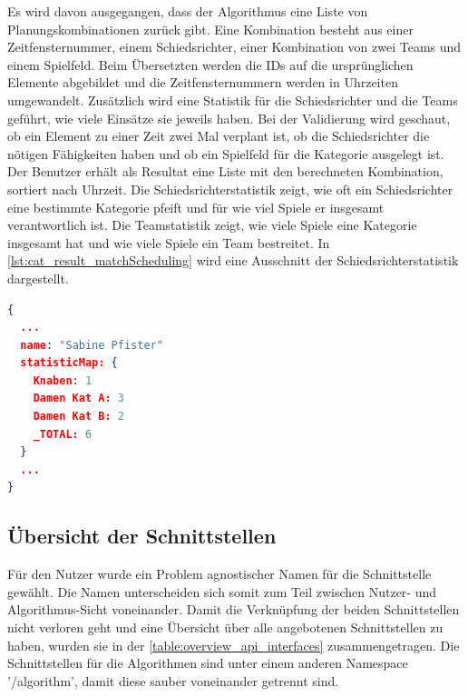 Es wird davon ausgegangen, dass der Algorithmus eine Liste von Planungskombinationen zurück gibt. Eine Kombination besteht aus einer Zeitfensternummer, einem Schiedsrichter, 
einer Kombination von zwei Teams und einem Spielfeld. Beim Übersetzten werden die IDs auf die ursprünglichen Elemente abgebildet und die Zeitfensternummern werden in Uhrzeiten 
umgewandelt. Zusätzlich wird eine Statistik für die Schiedsrichter und die Teams geführt, wie viele Einsätze sie jeweils haben. Bei der Validierung wird geschaut, ob ein Element zu einer Zeit zwei 
Mal verplant ist, ob die Schiedsrichter die nötigen Fähigkeiten haben und ob ein Spielfeld für die Kategorie ausgelegt ist. Der Benutzer erhält als Resultat eine Liste mit den berechneten 
Kombination, sortiert nach Uhrzeit. Die Schiedsrichterstatistik zeigt, wie oft ein Schiedsrichter eine bestimmte Kategorie pfeift und für wie viel Spiele er insgesamt verantwortlich ist. Die 
Teamstatistik zeigt, wie viele Spiele eine Kategorie insgesamt hat und wie viele Spiele ein Team bestreitet. In \autoref{lst:cat_result_matchScheduling} wird eine Ausschnitt der 
Schiedsrichterstatistik dargestellt.

\begin{lstlisting}[language=JSON, caption=Ausschnitt eines Resultats einer Spielplan Erstellung, label=lst:cat_result_matchScheduling]  
{
  ...
  name: "Sabine Pfister"
  statisticMap: {
    Knaben: 1
    Damen Kat A: 3
    Damen Kat B: 2
    _TOTAL: 6
  }
  ...
}
\end{lstlisting}

\subsection{Übersicht der Schnittstellen}
Für den Nutzer wurde ein Problem agnostischer Namen für die Schnittstelle gewählt. Die Namen unterscheiden sich somit zum Teil zwischen Nutzer- und Algorithmus-Sicht voneinander. Damit die 
Verknüpfung der beiden Schnittstellen nicht verloren geht und eine Übersicht über alle angebotenen Schnittstellen zu haben, wurden sie in der \autoref{table:overview_api_interfaces} 
zusammengetragen. Die Schnittstellen für die Algorithmen sind unter einem anderen Namespace '/algorithm', damit diese sauber voneinander getrennt sind.

